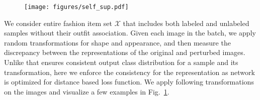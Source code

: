\documentclass[sigconf]{acmart}
\begin{document}
\begin{comment}
\begin{minipage}[b]{0.45\textwidth}
    \texttt{[image: figures/self\_sup.pdf]}
    \captionof{figure}{Examples showing different \textit{shape} ($\mathcal{T}_s$) and \textit{appearance} transformations ($\mathcal{T}_a$) of the original images (first column). Refer Sec. \ref{sec:l_ss} for details.}
    \label{fig:self_su}
\end{minipage}\qquad
\begin{minipage}[b]{0.45\textwidth}
\centering
    \captionof{table}{Statistics of Polyvore, Polyvore-D and newly created fashion dataset in terms of number of outfits in train, validation and test splits. We also mention overall fashion items in these datasets. Our dataset has $\sim$10 times more outfits than existing datasets.}
    \setlength{\tabcolsep}{5pt}
\begin{tabular}{l|cccc}
    \hline
        Dataset & Train & Validation & Test & \#items \\
        \hline
        Polyvore & $~53K$ & $10K$ & $~5K$ & $~365K$ \\
        Polyvore-D & $~17K$ & - & $~15K$ & $~175K$ \\
        Fashion Outfits & $~675K$ & $10K$ & $~20K$ & $~3M$ \\
        \hline
    \end{tabular}
\label{table:datasets}
\end{minipage}
\end{comment}

\begin{figure}
    \centering
    \texttt{[image: figures/self\_sup.pdf]}
    \label{fig:self_su}
    
\vspace{-3mm}
\end{figure}


We consider entire fashion item set $\mathcal{X}$ that includes both labeled and unlabeled samples without their outfit association. Given each image in the batch, we apply random transformations for shape and appearance, and then measure the discrepancy between the representations of the original and perturbed images. Unlike \cite{berthelot2019mixmatch,yun2019cutmix} that ensures consistent output class distribution for a sample and its transformation, here we enforce the consistency for the representation as network is optimized for distance based loss function. We apply following transformations on the images and visualize a few examples in Fig.~\ref{fig:self_su}.
\end{document}
